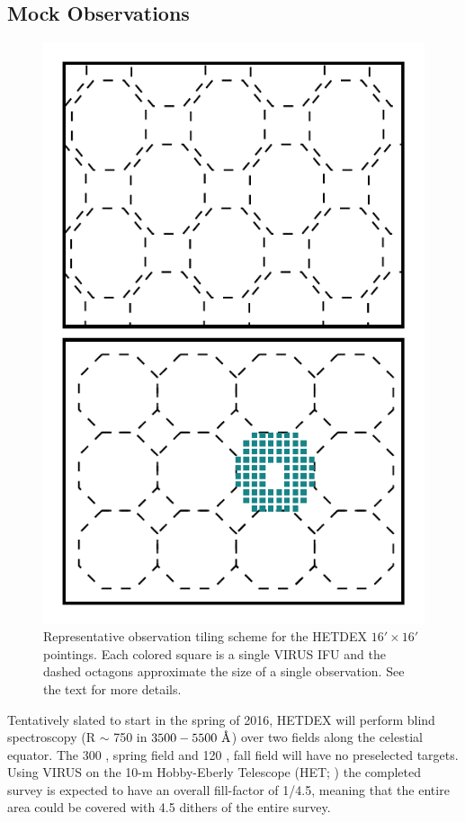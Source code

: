 \documentclass[fleqn,usenatbib]{mnras}
\begin{document}
\subsection{Mock Observations}\label{sec: observations}
\begin{figure} 
	\includegraphics[width=\columnwidth]{figures/pointings.pdf} 
	\caption{Representative observation tiling scheme for the HETDEX $16' \times 16'$ pointings. Each colored square is a single VIRUS IFU and the dashed octagons approximate the size of a single observation. See the text for more details.} \label{fig: ifu layout} 
\end{figure}

Tentatively slated to start in the spring of 2016, HETDEX will perform blind spectroscopy (R $\sim$ 750 in $3500 - 5500~\hbox{\AA}$) over two fields along the celestial equator. The 300 \degsq, spring field and 120 \degsq, fall field will have no preselected targets. Using VIRUS on the 10-m Hobby-Eberly Telescope (HET; \citealt{Ramsey1998}) the completed survey is expected to have an overall fill-factor of 1/4.5, meaning that the entire area could be covered with 4.5 dithers of the entire survey. 
\end{document}
